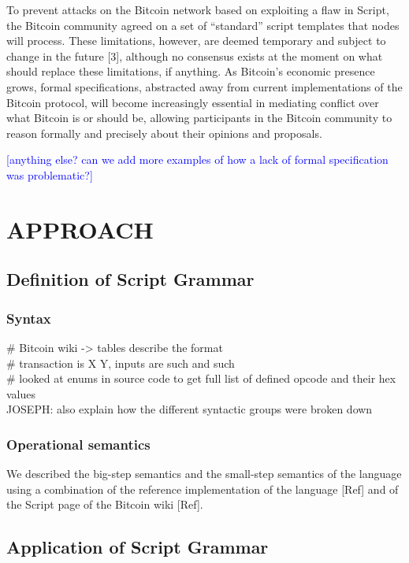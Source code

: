 \documentclass[letterpaper, 10 pt, conference]{ieeeconf}
\begin{document}
To prevent attacks on the Bitcoin network based on exploiting a flaw in Script, the Bitcoin community agreed on a set of ``standard'' script templates that nodes will process. These limitations, however, are deemed temporary and subject to change in the future [3], although no consensus exists at the moment on what should replace these limitations, if anything. As Bitcoin's economic presence grows, formal specifications, abstracted away from current implementations of the Bitcoin protocol, will become increasingly essential in mediating conflict over what Bitcoin is or should be, allowing participants in the Bitcoin community to reason formally and precisely about their opinions and proposals.

\textcolor{blue}{[anything else? can we add more examples of how a lack of formal specification was problematic?]}


\section{APPROACH}

\subsection{Definition of Script Grammar}

\subsubsection{Syntax}
\# Bitcoin wiki -> tables describe the format\\
\# transaction is X Y, inputs are such and such\\
\# looked at enums in source code to get full list of defined opcode and their hex values\\
JOSEPH: also explain how the different syntactic groups were broken down\\

\subsubsection{Operational semantics}

We described the big-step semantics and the small-step semantics of the language using a combination of the reference implementation of the language [Ref] and of the Script page of the Bitcoin wiki [Ref].


\subsection{Application of Script Grammar}
\end{document}
